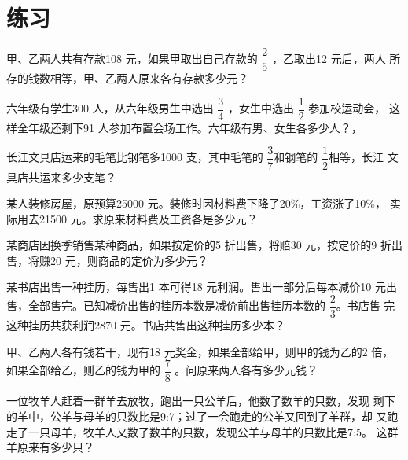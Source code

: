 \section{练习}
\vspace{-0.5cm}
\begin{exercise}
    甲、乙两人共有存款108 元，如果甲取出自己存款的
$\dfrac{2}{5}$ ，乙取出12 元后，两人
所存的钱数相等，甲、乙两人原来各有存款多少元？
\end{exercise}
\vspace{3cm}
\begin{exercise}
    六年级有学生300 人，从六年级男生中选出
$\dfrac{3}{4}$ ，女生中选出
$\dfrac{1}{2}$ 参加校运动会，
这样全年级还剩下91 人参加布置会场工作。六年级有男、女生各多少人？，
\end{exercise}
\vspace{3cm}
\begin{exercise}
    长江文具店运来的毛笔比钢笔多1000 支，其中毛笔的
$\dfrac{3}{7}$和钢笔的
$\dfrac{1}{2}$相等，长江
文具店共运来多少支笔？
\end{exercise}
\vspace{3cm}
\begin{exercise}
    某人装修房屋，原预算25000 元。装修时因材料费下降了20$\%$，工资涨了10$\%$，
实际用去21500 元。求原来材料费及工资各是多少元？
\end{exercise}
\vspace{3cm}
\begin{exercise}
    某商店因换季销售某种商品，如果按定价的5 折出售，将赔30 元，按定价的9
折出售，将赚20 元，则商品的定价为多少元？
\end{exercise}
\vspace{3cm}
\begin{exercise}
    某书店出售一种挂历，每售出1 本可得18 元利润。售出一部分后每本减价10
元出售，全部售完。已知减价出售的挂历本数是减价前出售挂历本数的
$\dfrac{2}{3}$。书店售
完这种挂历共获利润2870 元。书店共售出这种挂历多少本？
\end{exercise}
\vspace{3cm}
\begin{exercise}
    甲、乙两人各有钱若干，现有18 元奖金，如果全部给甲，则甲的钱为乙的2
倍，如果全部给乙，则乙的钱为甲的
$\dfrac{7}{8}$ 。问原来两人各有多少元钱？
\end{exercise}
\vspace{3cm}
\begin{exercise}
    一位牧羊人赶着一群羊去放牧，跑出一只公羊后，他数了数羊的只数，发现
剩下的羊中，公羊与母羊的只数比是9:7；过了一会跑走的公羊又回到了羊群，却
又跑走了一只母羊，牧羊人又数了数羊的只数，发现公羊与母羊的只数比是7:5。
这群羊原来有多少只？
\end{exercise}
